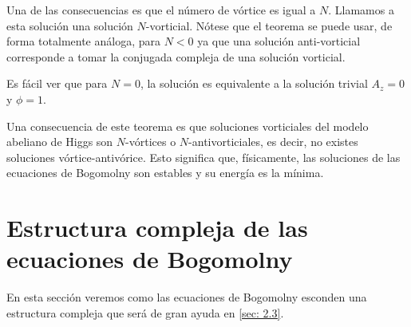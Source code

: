 Una de las consecuencias es que el número de vórtice es igual a $N$. Llamamos a esta solución una solución $N$-vorticial. Nótese que el teorema se puede usar, de forma totalmente análoga, para $N<0$ ya que una solución anti-vorticial corresponde a tomar la conjugada compleja de una solución vorticial.

Es fácil ver que para $N=0$, la solución es equivalente a la solución trivial $A_z=0$ y $\phi=1$.


Una consecuencia de este teorema es que soluciones vorticiales del modelo abeliano de Higgs son $N$-vórtices o $N$-antivorticiales, es decir, no existes soluciones vórtice-antivórice. Esto significa que, físicamente, las soluciones de las ecuaciones de Bogomolny son estables y su energía es la mínima.

\section{Estructura compleja de las ecuaciones de Bogomolny}
\label{sec:2.2}

En esta sección veremos como las ecuaciones de Bogomolny esconden una estructura compleja que será de gran ayuda en \ref{sec: 2.3}.

